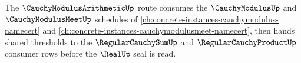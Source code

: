 The $\CauchyModulusArithmeticUp$ route consumes the $\CauchyModulusUp$ and $\CauchyModulusMeetUp$ schedules of \autoref{ch:concrete-instances-cauchymodulus-namecert} and \autoref{ch:concrete-instances-cauchymodulusmeet-namecert}, then hands shared thresholds to the $\RegularCauchySumUp$ and $\RegularCauchyProductUp$ consumer rows before the $\RealUp$ seal is read.




